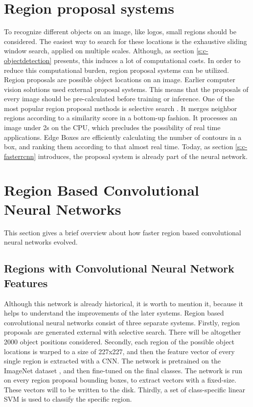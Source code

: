 \section{Region proposal systems}\label{s:c-rpn}
To recognize different objects on an image, like logos, small regions should be considered. The easiest way to search for these locations is the exhaustive sliding window search, applied on multiple scales. Although, as section \ref{s:c-objectdetection} presents, this induces a lot of computational costs. In order to reduce this computational burden, region proposal systems can be utilized. Region proposals are possible object locations on an image.
\smallbreak
Earlier computer vision solutions used external proposal systems. This means that the proposals of every image should be pre-calculated before training or inference. One of the most popular region proposal methods is selective search \cite{Uijlings13}. It merges neighbor regions according to a similarity score in a bottom-up fashion. It processes an image under 2s on the CPU, which precludes the possibility of real time applications. Edge Boxes \cite{edge-boxes-locating-object-proposals-from-edges} are efficiently calculating the number of contours in a box, and ranking them according to that almost real time. Today, as section \ref{s:c-fasterrcnn} introduces, the proposal system is already part of the neural network.

\section{Region Based Convolutional Neural Networks}\label{s:c-rcnn}

This section gives a brief overview about how faster region based convolutional neural networks evolved.

\subsection{Regions with Convolutional Neural Network Features}
Although this network is already historical, it is worth to mention it, because it helps to understand the improvements of the later systems. Region based convolutional neural networks \cite{DBLP:journals/corr/GirshickDDM13} consist of three separate systems. Firstly, region proposals are generated external with selective search. There will be altogether 2000 object positions considered. Secondly, each region of the possible object locations is warped to a size of 227x227, and then the feature vector of every single region is extracted with a CNN. The network is pretrained on the ImageNet dataset \cite{NIPS2012_4824}, and then fine-tuned on the final classes. The network is run on every region proposal bounding boxes, to extract vectors with a fixed-size. These vectors will to be written to the disk. Thirdly, a set of class-specific linear SVM is used to classify the specific region.

